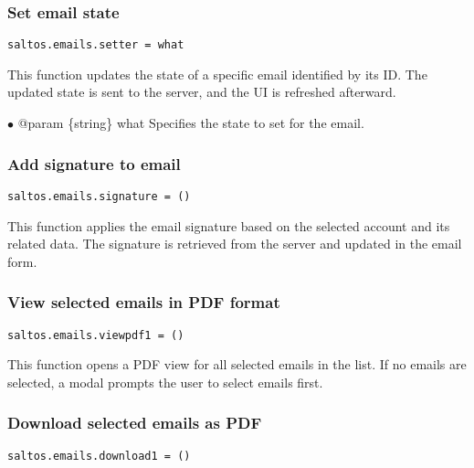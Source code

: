 \documentclass[a4paper]{article}
\begin{document}
\hypertarget{toc60}{}
\subsubsection{Set email state}

\begin{lstlisting}
saltos.emails.setter = what
\end{lstlisting}

This function updates the state of a specific email identified by its ID. The updated state is sent
to the server, and the UI is refreshed afterward.

\begin{compactitem}
\item[\color{myblue}$\bullet$] @param \{string\} what Specifies the state to set for the email.
\end{compactitem}

\hypertarget{toc61}{}
\subsubsection{Add signature to email}

\begin{lstlisting}
saltos.emails.signature = ()
\end{lstlisting}

This function applies the email signature based on the selected account and its related data.
The signature is retrieved from the server and updated in the email form.

\hypertarget{toc62}{}
\subsubsection{View selected emails in PDF format}

\begin{lstlisting}
saltos.emails.viewpdf1 = ()
\end{lstlisting}

This function opens a PDF view for all selected emails in the list.
If no emails are selected, a modal prompts the user to select emails first.

\hypertarget{toc63}{}
\subsubsection{Download selected emails as PDF}

\begin{lstlisting}
saltos.emails.download1 = ()
\end{lstlisting}
\end{document}
